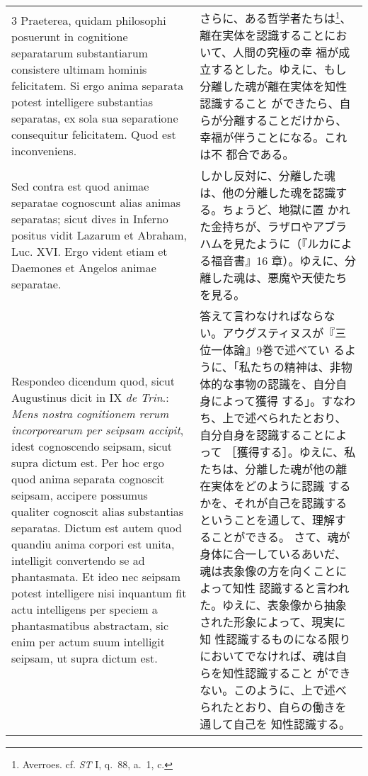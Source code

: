 \documentclass[10pt]{jsarticle} %
\begin{document}
\begin{longtable}{p{21em}p{21em}}
\\


3 {\sc Praeterea}, quidam philosophi posuerunt in
cognitione separatarum substantiarum consistere ultimam hominis
felicitatem. Si ergo anima separata potest intelligere substantias
separatas, ex sola sua separatione consequitur felicitatem. Quod est
inconveniens.

&

さらに、ある哲学者たちは\footnote{Averroes. cf. {\it ST} I, q.~88, a.~1, c.}、離在実体を認識することにおいて、人間の究極の幸
 福が成立するとした。ゆえに、もし分離した魂が離在実体を知性認識すること
 ができたら、自らが分離することだけから、幸福が伴うことになる。これは不
 都合である。

\\


{\sc Sed contra est} quod animae separatae
cognoscunt alias animas separatas; sicut dives in Inferno positus vidit
Lazarum et Abraham, Luc. XVI. Ergo vident etiam et Daemones et Angelos
animae separatae.

&

しかし反対に、分離した魂は、他の分離した魂を認識する。ちょうど、地獄に置
 かれた金持ちが、ラザロやアブラハムを見たように（『ルカによる福音書』16
 章）。ゆえに、分離した魂は、悪魔や天使たちを見る。

\\


{\sc Respondeo dicendum} quod, sicut Augustinus dicit in IX {\it de
Trin}.: {\it Mens nostra cognitionem rerum incorporearum per seipsam
accipit}, idest cognoscendo seipsam, sicut supra dictum est. Per hoc
ergo quod anima separata cognoscit seipsam, accipere possumus qualiter
cognoscit alias substantias separatas. Dictum est autem quod quandiu
anima corpori est unita, intelligit convertendo se ad phantasmata. Et
ideo nec seipsam potest intelligere nisi inquantum fit actu intelligens
per speciem a phantasmatibus abstractam, sic enim per actum suum
intelligit seipsam, ut supra dictum est. 

&

答えて言わなければならない。アウグスティヌスが『三位一体論』9巻で述べてい
 るように、「私たちの精神は、非物体的な事物の認識を、自分自身によって獲得
 する」。すなわち、上で述べられたとおり、自分自身を認識することによって
 ［獲得する］。ゆえに、私たちは、分離した魂が他の離在実体をどのように認識
 するかを、それが自己を認識するということを通して、理解することができる。
さて、魂が身体に合一しているあいだ、魂は表象像の方を向くことによって知性
 認識すると言われた。ゆえに、表象像から抽象された形象によって、現実に知
 性認識するものになる限りにおいてでなければ、魂は自らを知性認識すること
 ができない。このように、上で述べられたとおり、自らの働きを通して自己を
 知性認識する。


\end{longtable}
\end{document}
